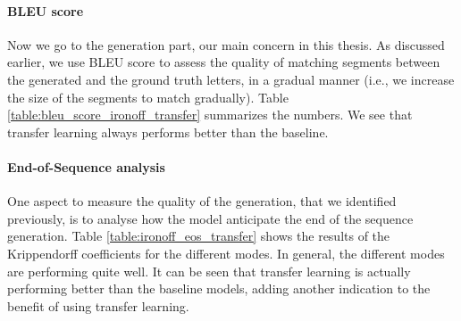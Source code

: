 
    \paragraph{BLEU score}
      Now we go to the generation part, our main concern in this thesis. As discussed earlier, we use BLEU score to assess the quality of matching segments between the generated and the ground truth letters, in a gradual manner (i.e., we increase the size of the segments to match gradually). Table \ref{table:bleu_score_ironoff_transfer} summarizes the numbers. We see that transfer learning always performs better than the baseline.
    \paragraph{End-of-Sequence analysis}
    One aspect to measure the quality of the generation, that we identified previously, is to analyse how the model anticipate the end of the sequence generation. Table \ref{table:ironoff_eos_transfer} shows the results of the Krippendorff coefficients for the different modes. In general, the different modes are performing quite well. It can be seen that transfer learning is actually performing better than the baseline models, adding another indication to the benefit of using transfer learning.

